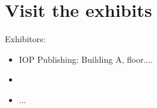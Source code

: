 \section*{Visit the exhibits}
Exhibitors:
\begin{itemize}
\item IOP Publishing: Building A, floor....
\item
\item ...
\end{itemize}

